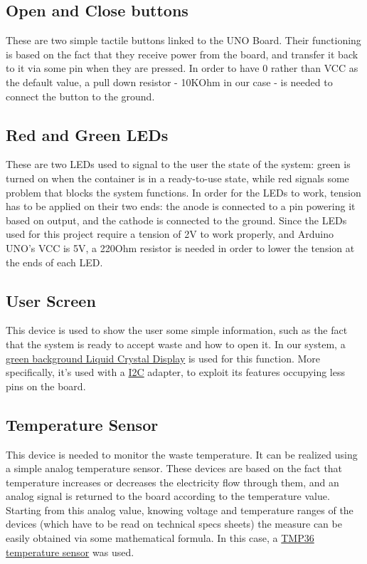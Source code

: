 \documentclass[a4paper,12pt]{report}
\begin{document}
	\subsection{Open and Close buttons}
	These are two simple tactile buttons linked to the UNO Board.\newline
	Their functioning is based on the fact that they receive power from the board, and transfer it back to it via some pin when they are pressed. In order to have 0 rather than VCC as the default value, a pull down resistor - 10KOhm in our case - is needed to connect the button to the ground.
	
	\subsection{Red and Green LEDs}
	These are two LEDs used to signal to the user the state of the system: green is turned on when the container is in a ready-to-use state, while red signals some problem that blocks the system functions.\newline
	In order for the LEDs to work, tension has to be applied on their two ends: the anode is connected to a pin powering it based on output, and the cathode is connected to the ground. Since the LEDs used for this project require a tension of 2V to work properly, and Arduino UNO's VCC is 5V, a 220Ohm resistor is needed in order to lower the tension at the ends of each LED.
	
	\subsection{User Screen}
	This device is used to show the user some simple information, such as the fact that the system is ready to accept waste and how to open it.\newline
	In our system, a \href{https://robot-italy.com/products/16x2-lcd-display-green?_pos=3&_psq=display+lcd&_ss=e&_v=1.0}{green background Liquid Crystal Display} is used for this function. More specifically, it's used with a \href{https://en.wikipedia.org/wiki/I%C2%B2C}{I2C} adapter, to exploit its features occupying less pins on the board.
	
	\subsection{Temperature Sensor}
	This device is needed to monitor the waste temperature.\newline
	It can be realized using a simple analog temperature sensor. These devices are based on the fact that temperature increases or decreases the electricity flow through them, and an analog signal is returned to the board according to the temperature value. Starting from this analog value, knowing voltage and temperature ranges of the devices (which have to be read on technical specs sheets) the measure can be easily obtained via some mathematical formula. In this case, a \href{https://www.analog.com/en/products/tmp36.html?doc=TMP35_36_37.pdf#part-details}{TMP36 temperature sensor} was used.
	
\end{document}
